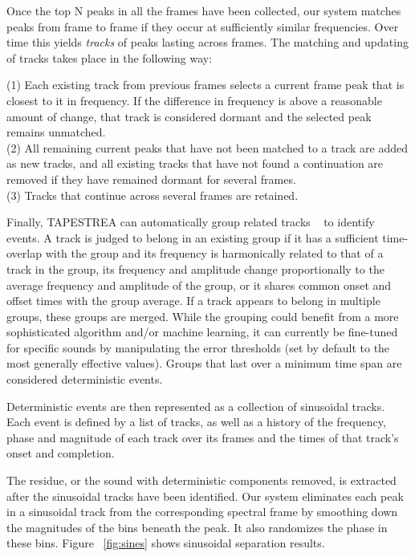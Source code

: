 \documentclass[review]{acmsiggraph}      %
\begin{document}
Once the top N peaks in all the frames have been collected, our system matches peaks 
from frame to frame if they occur at sufficiently similar frequencies. 
Over time this yields \emph{tracks} of peaks lasting across frames. The 
matching and updating of tracks takes place in the following way:

(1) Each existing track from previous frames selects a current frame peak that is 
closest to it in frequency. If the difference in 
frequency is above a reasonable amount of change, that track is considered dormant 
and the selected peak remains unmatched.\\
(2) All remaining current peaks that have not been matched to a track are 
added as new tracks, and all existing tracks that have not found a 
continuation are removed if they have remained dormant for several frames.\\
(3) Tracks that continue across several frames are retained. 

Finally, TAPESTREA can automatically group related tracks ~\cite{Ellis94,Melih00} 
to identify events. A track is judged to belong in an existing group if it has a 
sufficient time-overlap with the group and its frequency is harmonically 
related to that of a track in the group, its frequency and amplitude 
change proportionally to the average frequency and amplitude of the 
group, or it shares common onset and offset times with the group average. If a track 
appears to belong in multiple groups, these groups are merged. While the grouping could 
benefit from a more sophisticated algorithm and/or machine learning, it can currently be 
fine-tuned for specific sounds by manipulating the error thresholds (set by default to the 
most generally effective values). Groups that last over a minimum time span are considered 
deterministic events. 

Deterministic events are then represented as a collection of sinusoidal tracks. Each 
event is defined by a list of tracks, as well as 
a history of the frequency, phase and magnitude of each track 
over its frames and the times of that track's onset and completion. 

The residue, or the sound with deterministic components removed, is extracted 
after the sinusoidal tracks have 
been identified. Our system eliminates each peak in a sinusoidal track from the corresponding 
spectral frame by smoothing down the magnitudes of the bins beneath the peak. 
It also randomizes the phase in these bins. Figure ~\ref{fig:sines} shows sinusoidal 
separation results. 
\end{document}
